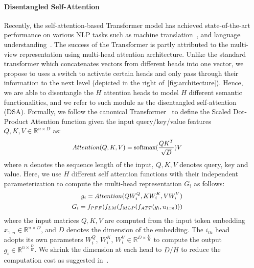 \documentclass[11pt,a4paper]{article}
\begin{document}
\paragraph{Disentangled Self-Attention}
Recently, the self-attention-based Transformer model has achieved state-of-the-art performance on various NLP tasks such as machine translation~\cite{vaswani2017attention}, and language understanding~\cite{devlin2018bert,radford2018improving}. The success of the Transformer is partly attributed to the multi-view representation using multi-head attention architecture. Unlike the standard transformer which concatenates vectors from different heads into one vector, we propose to uses a switch to activate certain heads and only pass through their information to the next level (depicted in the right of~\autoref{fig:architecture}). Hence, we are able to disentangle the $H$ attention heads to model $H$ different semantic functionalities, and we refer to such module as the disentangled self-attention (DSA). Formally, we follow the canonical Transformer~\cite{vaswani2017attention} to define the Scaled Dot-Product Attention function given the input query/key/value features $Q, K, V \in \mathbb{R}^{n \times D}$ as: 
\begin{gather}
\small
\begin{split}
    Attention(Q, K, V) = \text{softmax}(\frac{QK^T}{\sqrt{D}})V
\end{split}
\end{gather}
where $n$ denotes the sequence length of the input, $Q, K, V$ denotes query, key and value. Here, we use $H$ different self attention functions with their independent parameterization to compute the multi-head representation $G_i$ as follows: 
\begin{gather}
\small
\begin{split}
    g_i = Attention(QW_i^Q, KW_i^K, VW_i^V)\\
    G_i = f_{PFF}(f_{LM}(f_{MLP}(f_{ATT}(g_i, u_{1:m})))
\end{split}
\end{gather}
where the input matrices $Q,K, V$ are computed from the input token embedding $x_{1:n} \in \mathbb{R}^{n \times D}$, and $D$ denotes the dimension of the embedding. The $i_{th}$ head adopts its own parameters $W_i^Q$, $W_i^K$, $W_i^V \in \mathbb{R}^{D \times \frac{D}{H}}$ to compute the output $g_i \in \mathbb{R}^{n \times  \frac{D}{H}}$. We shrink the dimension at each head to $D/H$ to reduce the computation cost as suggested in~\citet{vaswani2017attention}. 
\end{document}
